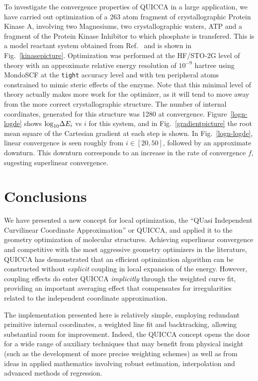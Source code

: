 \documentclass[prl,aps,preprint,showpacs,superbib]{revtex4}
\begin{document}
To investigate the convergence properties of QUICCA in a large application, we have carried out
optimization of a 263 atom fragment of crystallographic Protein Kinase A, involving two Magnesiums,
two crystallographic waters, ATP and a fragment of the Protein Kinase Inhibitor to which phosphate 
is transfered. This is a model reactant system obtained from Ref.~ and is shown in 
Fig.~\ref{kinasepicture}.  Optimization was performed at the HF/STO-2G level of theory with an 
approximate relative energy resolution of $10^{-9}$ hartree using MondoSCF \cite{MondoSCF} at the 
{\tt tight} accuracy level and with ten peripheral atoms  constrained to mimic steric effects of the enzyme.  
Note that this minimal level of theory actually makes more work for the optimizer, as it will tend to 
move away from the more correct crystallographic structure. The number of internal coordinates, generated 
for this structure was 1280 at convergence.  Figure~\ref{logn-logde} shows ${\rm log}_{10} \Delta E_i$ 
vs $i$ for this system, and in Fig.~\ref{gradientpicture} the root mean square of the Cartesian gradient 
at each step is shown.   In Fig.~\ref{logn-logde}, linear convergence is seen roughly from 
$i \in [20,50]$, followed by an approximate downturn.  This downturn corresponds to an increase 
in the rate of convergence $f$, sugesting superlinear convergence.

\section{Conclusions}

We have presented a new concept for local optimization, the ``QUasi Independent Curvilinear 
Coordinate Approximation'' or  QUICCA, and applied it to the geometry optimization of molecular 
structures. Achieving superlinear convergence and competitive with the most aggressive geometry 
optimizers in the literature, QUICCA has demonstrated that an efficient optimization algorithm 
can be constructed without {\em explicit} coupling in local expansion of the energy.  
However, coupling effects do enter QUICCA {\em implicitly} through the weighted curve fit, 
providing an important averaging effect that compensates for irregularities related
to the independent coordinate approximation.  

The implementation presented here is relatively simple, employing redundant primitive 
internal coordinates, a weighted line fit and backtracking, allowing  substantial room for 
improvement.  Indeed, the QUICCA concept opens the door for a wide range of auxiliary techniques 
that may benefit from physical insight (such as the development of more precise weighting schemes) 
as well as from ideas in applied mathematics involving robust estimation, interpolation and 
advanced methods of regression.  
\end{document}
